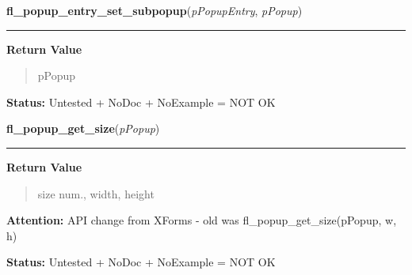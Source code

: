    \label{xformslib:library:fl_popup_entry_set_subpopup}

    \vspace{0.5ex}

\hspace{.8\funcindent}\begin{boxedminipage}{\funcwidth}

    \raggedright \textbf{fl\_popup\_entry\_set\_subpopup}(\textit{pPopupEntry}, \textit{pPopup})

    \vspace{-1.5ex}

    \rule{\textwidth}{0.5\fboxrule}
\setlength{\parskip}{2ex}
\setlength{\parskip}{1ex}
      \textbf{Return Value}
    \vspace{-1ex}

      \begin{quote}
      pPopup

      \end{quote}

\textbf{Status:} Untested + NoDoc + NoExample = NOT OK



    \end{boxedminipage}

    \label{xformslib:library:fl_popup_get_size}

    \vspace{0.5ex}

\hspace{.8\funcindent}\begin{boxedminipage}{\funcwidth}

    \raggedright \textbf{fl\_popup\_get\_size}(\textit{pPopup})

    \vspace{-1.5ex}

    \rule{\textwidth}{0.5\fboxrule}
\setlength{\parskip}{2ex}
\setlength{\parskip}{1ex}
      \textbf{Return Value}
    \vspace{-1ex}

      \begin{quote}
      size num., width, height

      \end{quote}

\textbf{Attention:} API change from XForms - old was fl\_popup\_get\_size(pPopup, w, h)



\textbf{Status:} Untested + NoDoc + NoExample = NOT OK



    \end{boxedminipage}

